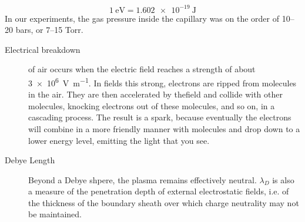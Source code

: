 \documentclass[openany]{book}
\begin{document}
$$\SI{1}{\electronvolt}=\SI{1.602e-19}{\joule}$$
In our experiments, the gas pressure inside the capillary was on the order of \numrange[range-phrase = --]{10}{20} bars, or \numrange[range-phrase = --]{7}{15} Torr.
\begin{description}
\item[Electrical  breakdown] of air occurs when the electric field reaches a strength of about \SI{3e6}{\volt\per\m}. In fields this strong, electrons are ripped from molecules in the air. They are then accelerated by thefield and collide with other molecules, knocking electrons out of these molecules,  and  so  on,  in  a  cascading  process.  The  result  is  a spark, because eventually the electrons will combine in a more friendly manner with molecules and drop down to a lower energy level, emitting the light that you see.
\item[Debye Length] Beyond a Debye shpere, the plasma remains effectively neutral. $\lambda_D$ is also a measure of the penetration depth of external electrostatic fields, i.e. of the thickness of the boundary sheath over which charge neutrality may not be maintained.


\end{description}
\end{document}
